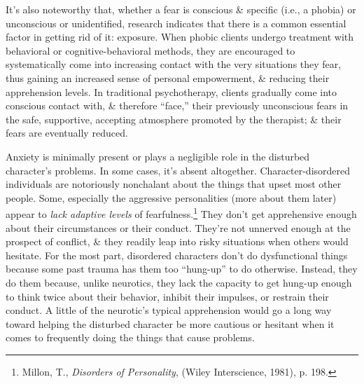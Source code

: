 \documentclass{article}
\numberwithin{equation}{section}
\begin{document}
It's also noteworthy that, whether a fear is conscious \& specific (i.e., a phobia) or unconscious or unidentified, research indicates that there is a common essential factor in getting rid of it: exposure. When phobic clients undergo treatment with behavioral or cognitive-behavioral methods, they are encouraged to systematically come into increasing contact with the very situations they fear, thus gaining an increased sense of personal empowerment, \& reducing their apprehension levels. In traditional psychotherapy, clients gradually come into conscious contact with, \& therefore ``face,'' their previously unconscious fears in the safe, supportive, accepting atmosphere promoted by the therapist; \& their fears are eventually reduced.

Anxiety is minimally present or plays a negligible role in the disturbed character's problems. In some cases, it's absent altogether. Character-disordered individuals are notoriously nonchalant about the things that upset most other people. Some, especially the aggressive personalities (more about them later) appear to \textit{lack adaptive levels} of fearfulness.\footnote{Millon, T., \textit{Disorders of Personality}, (Wiley Interscience, 1981), p. 198.} They don't get apprehensive enough about their circumstances or their conduct. They're not unnerved enough at the prospect of conflict, \& they readily leap into risky situations when others would hesitate. For the most part, disordered characters don't do dysfunctional things because some past trauma has them too ``hung-up'' to do otherwise. Instead, they do them because, unlike neurotics, they lack the capacity to get hung-up enough to think twice about their behavior, inhibit their impulses, or restrain their conduct. A little of the neurotic's typical apprehension would go a long way toward helping the disturbed character be more cautious or hesitant when it comes to frequently doing the  things that cause problems.
\end{document}
